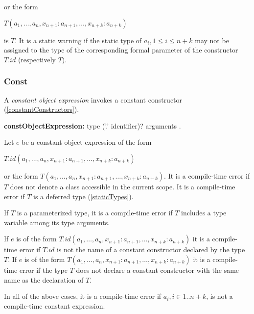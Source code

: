 \documentclass{article}
\begin{document}
or the form

\NEW{} $T(a_1, \ldots , a_n, x_{n+1}: a_{n+1}, \ldots , x_{n+k}: a_{n+k})$

is $T$.
It is a static warning if the static type of $a_i, 1 \le i \le n+ k$ may not be assigned to the type of the corresponding formal parameter of the constructor $T.id$ (respectively $T$).



\subsubsection{ Const}

\LMHash{}
A {\em constant object expression} invokes a constant constructor (\ref{constantConstructors}).

\begin{grammar}
{\bf constObjectExpression:}
\CONST{} type ('{\escapegrammar .}' identifier)? arguments
.
\end{grammar}

\LMHash{}
Let $e$ be a constant object expression of the form

\CONST{} $T.id(a_1, \ldots , a_n, x_{n+1}: a_{n+1}, \ldots , x_{n+k}: a_{n+k})$

or the form  \CONST{} $T(a_1, \ldots , a_n, x_{n+1}: a_{n+1}, \ldots , x_{n+k}: a_{n+k})$. It is a compile-time error if $T$ does not denote a class accessible in the current scope.  It is a compile-time error if $T$ is a deferred type (\ref{staticTypes}).


\LMHash{}
If $T$ is a parameterized type, it is a compile-time error if $T$ includes a type variable among its type arguments.

\LMHash{}
If $e$ is of the form \CONST{} $T.id(a_1, \ldots , a_n, x_{n+1}: a_{n+1}, \ldots , x_{n+k}: a_{n+k})$ it is a compile-time error if $T.id$ is not the name of a constant constructor declared by the type $T$. If $e$ is of the form  \CONST{} $T(a_1, \ldots , a_n, x_{n+1}: a_{n+1}, \ldots , x_{n+k}: a_{n+k})$ it is a compile-time error if the type $T$ does not declare a constant constructor with the same name as the declaration of $T$.

\LMHash{}
In all of the above cases, it is a compile-time error if $a_i,  i\in 1 .. n + k$, is not a compile-time constant expression.

\end{document}
